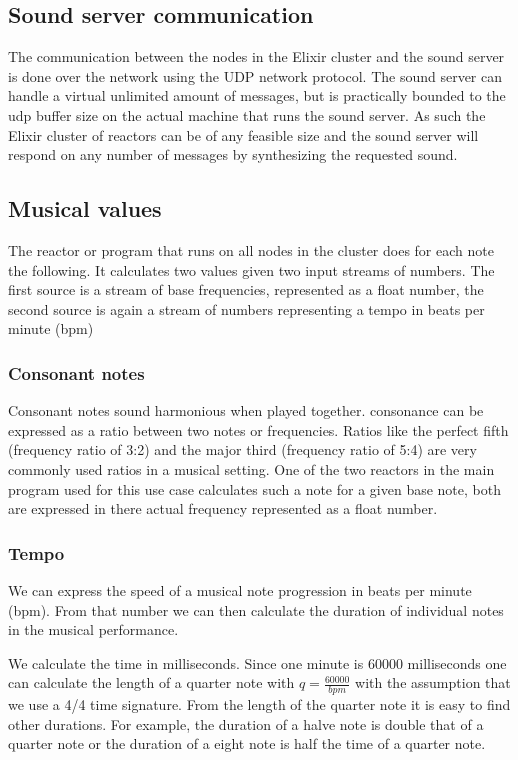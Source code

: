 \documentclass[a4paper]{book}
\begin{document}
\subsection{Sound server communication}
The communication between the nodes in the Elixir cluster and the sound server is done over the network using the UDP network protocol. The sound server can handle a virtual unlimited amount of messages, but is practically bounded to the udp buffer size on the actual machine that runs the sound server. As such the Elixir cluster of reactors can be of any feasible size and the sound server will respond on any number of messages by synthesizing the requested sound. 

\subsection{Musical values}
The reactor or program that runs on all nodes in the cluster does for each note the following. It calculates two values given two input streams of numbers. The first source is a stream of base frequencies, represented as a float number, the second source is again a stream of numbers representing a tempo in beats per minute (bpm)

\subsubsection*{Consonant notes}
Consonant notes sound harmonious when played together. consonance can be expressed as a ratio between two notes or frequencies. Ratios like the perfect fifth (frequency ratio of 3:2) and the major third (frequency ratio of 5:4) are very commonly used ratios in a musical setting. One of the two reactors in the main program used for this use case calculates such a note for a given base note, both are expressed in there actual frequency represented as a float number.

\subsubsection*{Tempo}
We can express the speed of a musical note progression in beats per minute (bpm). From that number we can then calculate the duration of individual notes in the musical performance. 

We calculate the time in milliseconds. Since one minute is 60000 milliseconds one can calculate the length of a quarter note with \(q = \frac{60000}{bpm}\) with the assumption that we use a 4/4 time signature. From the length of the quarter note it is easy to find other durations. For example, the duration of a halve note is double that of a quarter note or the duration of a eight note is half the time of a quarter note.
\end{document}

